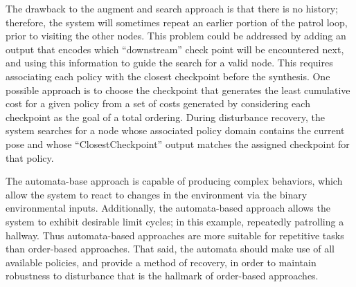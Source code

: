 The drawback to the augment and search approach is that there is no history;
therefore, the system will sometimes repeat an earlier portion of the patrol loop,
prior to visiting the other nodes.  This problem could be addressed by adding an
output that encodes which ``downstream'' check point will be encountered next, and
using this information to guide the search for a valid node.  This requires
associating each policy with the closest checkpoint before the synthesis.  One
possible approach is to choose the checkpoint that generates the least cumulative
cost for a given policy from a set of costs generated by considering each checkpoint
as the goal of a total ordering.  During disturbance recovery, the system searches
for a node whose associated policy domain contains the current pose and whose
``ClosestCheckpoint'' output matches the assigned checkpoint for that policy.


The automata-base approach is capable of producing complex behaviors, which allow the
system to react to changes in the environment via the binary environmental inputs.
Additionally, the automata-based approach allows the system to exhibit desirable
limit cycles; in this example, repeatedly patrolling a hallway.  Thus automata-based
approaches are more suitable for repetitive tasks than order-based approaches.  That
said, the automata should make use of all available policies, and provide a method of
recovery, in order to maintain robustness to disturbance that is the hallmark of
order-based approaches.






